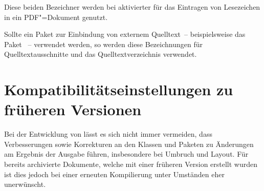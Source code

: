 \begin{Declaration}{}
\begin{Declaration}{}
\printdeclarationlist%
%
Diese beiden Bezeichner werden bei aktivierter  für das 
Eintragen von Lesezeichen in ein PDF"=Dokument genutzt.
\end{Declaration}
\end{Declaration}

\begin{Declaration}{}
\begin{Declaration}{}
\printdeclarationlist%
%
Sollte ein Paket zur Einbindung von externem Quelltext~-- beispielsweise 
das Paket ~-- verwendet werden, so werden diese Bezeichnungen 
für Quelltextausschnitte und das Quelltextverzeichnis verwendet.
\end{Declaration}
\end{Declaration}

\section{Kompatibilitätseinstellungen zu früheren Versionen}
Bei der Entwicklung von \TUDScript lässt es sich nicht immer vermeiden, dass 
Verbesserungen sowie Korrekturen an den Klassen und Paketen zu Änderungen am 
Ergebnis der Ausgabe führen, insbesondere bei Umbruch und Layout. Für bereits
archivierte Dokumente, welche mit einer früheren Version erstellt wurden ist 
dies jedoch bei einer erneuten Kompilierung unter Umständen eher unerwünscht.

